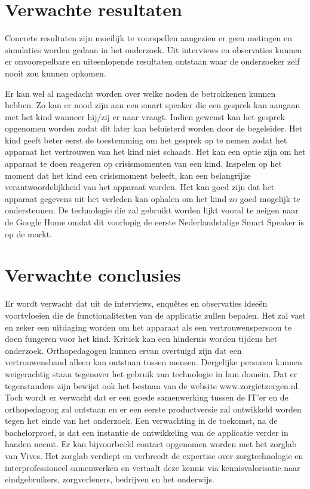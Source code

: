 \section{Verwachte resultaten}
\label{sec:verwachte_resultaten}

Concrete resultaten zijn moeilijk te voorspellen aangezien er geen metingen en simulaties worden gedaan in het onderzoek. Uit interviews en observaties kunnen er onvoorspelbare en uiteenlopende resultaten ontstaan waar de onderzoeker zelf nooit zou kunnen opkomen.

Er kan wel al nagedacht worden over welke noden de betrokkenen kunnen hebben. Zo kan er nood zijn aan een smart speaker die een gesprek kan aangaan met het kind wanneer hij/zij er naar vraagt. Indien gewenst kan het gesprek opgenomen worden zodat dit later kan beluisterd worden door de begeleider. Het kind geeft beter eerst de toestemming om het gesprek op te nemen zodat het apparaat het vertrouwen van het kind niet schaadt.
Het kan een optie zijn om het apparaat te doen reageren op crisismomenten van een kind. Inspelen op het moment dat het kind een crisismoment beleeft, kan een belangrijke verantwoordelijkheid van het apparaat worden.
Het kan goed zijn dat het apparaat gegevens uit het verleden kan ophalen om het kind zo goed mogelijk te ondersteunen.
De technologie die zal gebruikt worden lijkt vooral te neigen naar de Google Home omdat dit voorlopig de eerste Nederlandstalige Smart Speaker is op de markt.

\section{Verwachte conclusies}
\label{sec:verwachte_conclusies}

Er wordt verwacht dat uit de interviews, enquêtes en observaties ideeën voortvloeien die de functionaliteiten van de applicatie zullen bepalen. Het zal vast en zeker een uitdaging worden om het apparaat als een vertrouwenspersoon te doen fungeren voor het kind.
Kritiek kan een hindernis worden tijdens het onderzoek.
Orthopedagogen kunnen ervan overtuigd zijn dat een vertrouwensband alleen kan ontstaan tussen mensen. Dergelijke personen kunnen weigerachtig staan tegenover het gebruik van technologie in hun domein.
Dat er tegenstanders zijn bewijst ook het bestaan van de website www.zorgictzorgen.nl.
Toch wordt er verwacht dat er een goede samenwerking tussen de IT'er en de orthopedagoog zal ontstaan en er een eerste productversie zal ontwikkeld worden tegen het einde van het onderzoek.
Een verwachting in de toekomst, na de bachelorproef, is dat een instantie de ontwikkeling van de applicatie verder in handen neemt. Er kan bijvoorbeeld contact opgenomen worden met het zorglab van Vives. Het zorglab verdiept en verbreedt de expertise over zorgtechnologie en interprofessioneel samenwerken en vertaalt deze kennis via kennisvalorisatie naar eindgebruikers, zorgverleners, bedrijven en het onderwijs.~\autocite{Vives}

